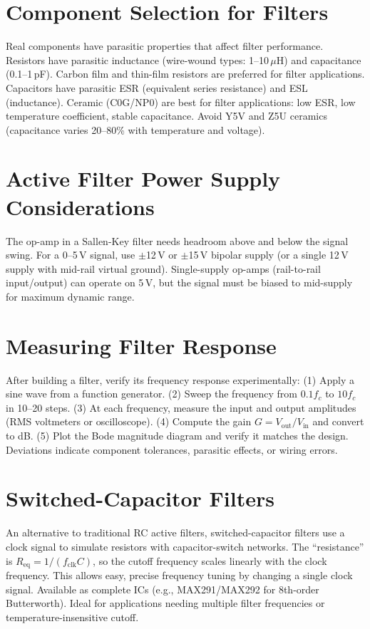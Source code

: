 \documentclass[11pt,letterpaper,twoside,openany]{book}
\begin{document}
\section{Component Selection for Filters}
Real components have parasitic properties that affect filter performance. Resistors have parasitic inductance (wire-wound types: 1--10\,$\mu$H) and capacitance (0.1--1\,pF). Carbon film and thin-film resistors are preferred for filter applications. Capacitors have parasitic ESR (equivalent series resistance) and ESL (inductance). Ceramic (C0G/NP0) are best for filter applications: low ESR, low temperature coefficient, stable capacitance. Avoid Y5V and Z5U ceramics (capacitance varies 20--80\% with temperature and voltage).

\section{Active Filter Power Supply Considerations}
The op-amp in a Sallen-Key filter needs headroom above and below the signal swing. For a 0--5\,V signal, use $\pm$12\,V or $\pm$15\,V bipolar supply (or a single 12\,V supply with mid-rail virtual ground). Single-supply op-amps (rail-to-rail input/output) can operate on 5\,V, but the signal must be biased to mid-supply for maximum dynamic range.

\section{Measuring Filter Response}
After building a filter, verify its frequency response experimentally: (1) Apply a sine wave from a function generator. (2) Sweep the frequency from $0.1 f_c$ to $10 f_c$ in 10--20 steps. (3) At each frequency, measure the input and output amplitudes (RMS voltmeters or oscilloscope). (4) Compute the gain $G = V_{\text{out}}/V_{\text{in}}$ and convert to dB. (5) Plot the Bode magnitude diagram and verify it matches the design. Deviations indicate component tolerances, parasitic effects, or wiring errors.

\section{Switched-Capacitor Filters}
An alternative to traditional RC active filters, switched-capacitor filters use a clock signal to simulate resistors with capacitor-switch networks. The ``resistance'' is $R_{\text{eq}} = 1/(f_{\text{clk}} C)$, so the cutoff frequency scales linearly with the clock frequency. This allows easy, precise frequency tuning by changing a single clock signal. Available as complete ICs (e.g., MAX291/MAX292 for 8th-order Butterworth). Ideal for applications needing multiple filter frequencies or temperature-insensitive cutoff.
\end{document}
